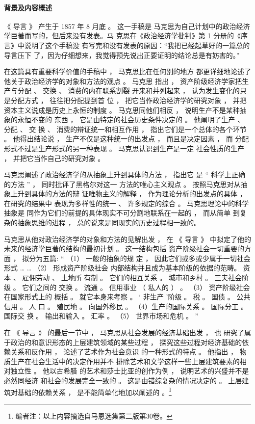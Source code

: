 \documentclass[a4paper,twoside,12pt,AutoFakeBold]{ctexart}
\begin{document}
\paragraph{背景及内容概述}\begin{fangsong}
《 导言 》 产生于 1857 年 8 月底 。 这一手稿是
马克思为自己计划中的政治经济学巨著而写的，但后来没有发表。马
克思在《政治经济学批判》第 1 分册的《序言》中说明了这个手稿没
有写完和没有发表的原因：“我把已经起草好的一篇总的导言压下
了，因为仔细想来，我觉得预先说出正要证明的结论总是有妨害的。”

在这篇具有重要科学价值的手稿中 ， 马克思比在任何别的地方
都更详细地论述了他关于政治经济学的对象和方法的观点 。 马克思
指出 ， 资产阶级经济学家把生产与分配 、 交换 、 消费的内在联系割裂
开来和并列起来 ， 认为发生变化的只是分配方式 ， 往往把分配提到首
位 ， 把它当作政治经济学的研究对象 ， 并把资本主义说成是历史上永恒的制度 。 马克思同他们相反 ， 说明生产不是某种抽象的永恒不变的
东西 ， 它是由特定的社会历史条件决定的 。 他阐明了生产 、 分配 、 交
换 、 消费的辩证统一和相互作用 ， 指出它们是一个总体的各个环节 。
他得出结论说 ， 生产不仅是这种统一的出发点 ， 而且是决定因素 ， 而
分配形式不过是生产形式的另一种表现 。 马克思认识到生产是一定
社会性质的生产 ， 并把它当作自己的研究对象 。

马克思阐述了政治经济学的从抽象上升到具体的方法 ， 指出它
是 “ 科学上正确的方法 ” ， 同时批评了黑格尔对这一
方法的唯心主义观点 。 按照马克思对从抽象上升到具体的方法的辩
证唯物主义的解释 ， 作为理论分析的出发点的具体 ， 在研究的结果中
表现为多样性的统一 、 许多规定的综合 。 马克思理论中的科学抽象是
同作为它们的前提的具体现实不可分割地联系在一起的 ， 而从简单
到复杂的抽象思维的进程 ， 总的说来是同现实的历史过程相一致的。

马克思从他对政治经济学的对象和方法的见解出发 ， 在 《 导言 》
中拟定了他的未来的经济学巨著的结构的最初计划 。 这一结构包括
资产阶级社会一切重要的方面 ， 拟分为五篇: “ （1） 一般的抽象的规
定 ， 因此它们或多或少属于一切社会形式 … … （2） 形成资产阶级社会
内部结构并且成为基本阶级的依据的范畴。 资本 、 雇佣劳动 、 土地所
有制 。 它们的相互关系 。 城市和乡村 。 三夫社会阶级 。 它们之间的
交换 。 流通 。 信用事业 （ 私人的 ） 。 （3） 资产阶级社会在国家形式上的
概括 。 就它本身来考察 。 ‘ 非生产 ’阶级 。 税 。 国债 。 公共信用 。 人
口 。 殖民地 。 向国外移民 。 （4）生产的国际关系 。 国际分工 。 国际交
换 。 输出和输入 。 汇率 。 （5） 世界市场和危机 。 ”

在 《 导言 》 的最后一节中 ， 马克思从社会发展的经济基础出发 ， 也
研究了属于政治的和意识形态的上层建筑领域的某些过程 ， 探究这些过程对经济基础的依赖关系和反作用 ， 论述了艺术作为社会意识
的一种形式的特点 。 他指出 ， 物质生产在社会生活中的决定作用并不
排除艺术和文学这样一些上层建筑要素的相对独立性 。 他以古希腊
的艺术和莎士比亚的创作为例 ， 说明艺术的兴盛并不是必然同经济
和社会的发展完全一致的 。 这是由错综复杂的情况决定的 。 上层建
筑对基础的依赖关系 ， 是不能简单化地加以阐述的 。\footnote{编者注：以上内容摘选自马恩选集第二版第30卷。}
\end{fangsong}
\end{document}
